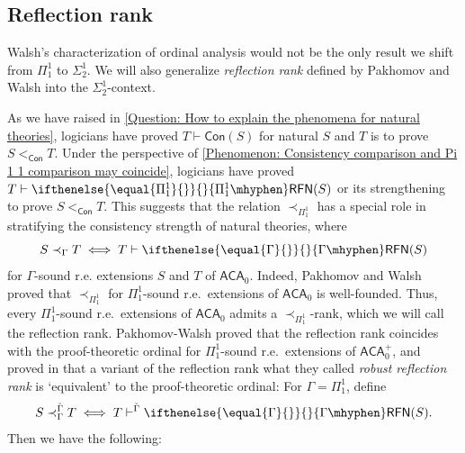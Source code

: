 \documentclass{mhkr}
\newcommand{\added}[1]{#1}
\newcommand{\Con}{\mathsf{Con}}
\newcommand{\RFN}[1][]{\ifthenelse{\equal{#1}{}}{}{#1\mhyphen}\mathsf{RFN}}
\newcommand{\ACA}{\mathsf{ACA}}
\begin{document}
\subsection{Reflection rank} \label{Subsection: Reflection rank}
\added{Walsh's characterization of ordinal analysis would not be the only result we shift from $\Pi^1_1$ to $\Sigma^1_2$. We will also generalize \emph{reflection rank} defined by Pakhomov and Walsh \cite{PakhomovWalsh2021Reflection} into the $\Sigma^1_2$-context.

As we have raised in \autoref{Question: How to explain the phenomena for natural theories}, logicians have proved $T\vdash \Con(S)$ for natural $S$ and $T$ is to prove $S<_\Con T$. Under the perspective of \autoref{Phenomenon: Consistency comparison and Pi 1 1 comparison may coincide}, logicians have proved $T\vdash \RFN[\Pi^1_1](S)$ or its strengthening to prove $S <_\Con T$. This suggests that the relation $\prec_{\Pi^1_1}$ has a special role in stratifying the consistency strength of natural theories, where
\begin{equation*}
    S\prec_{\Gamma} T \iff T\vdash \RFN[\Gamma](S)
\end{equation*}
for $\Gamma$-sound r.e. extensions $S$ and $T$ of $\ACA_0$.
Indeed, Pakhomov and Walsh \cite{PakhomovWalsh2021Reflection} proved that $\prec_{\Pi^1_1}$ for $\Pi^1_1$-sound r.e.\ extensions of $\ACA_0$ is well-founded.}
Thus, every $\Pi^1_1$-sound r.e.\ extensions of $\ACA_0$ admits a $\prec_{\Pi^1_1}$-rank, which we will call the reflection rank. Pakhomov-Walsh \cite{PakhomovWalsh2021ReflectionInfDeriv} proved that the reflection rank coincides with the proof-theoretic ordinal for $\Pi^1_1$-sound r.e.\ extensions of $\ACA_0^+$, and proved in \cite[\S 5.4]{PakhomovWalsh2021Reflection} that a variant of the reflection rank what they called \emph{robust reflection rank} is `equivalent' to the proof-theoretic ordinal: For $\Gamma=\Pi^1_1$, define
\begin{equation*}
    S\prec^{\check{\Gamma}}_\Gamma T \iff T\vdash^{\check{\Gamma}} \RFN[\Gamma](S).
\end{equation*}
Then we have the following:
\end{document}
